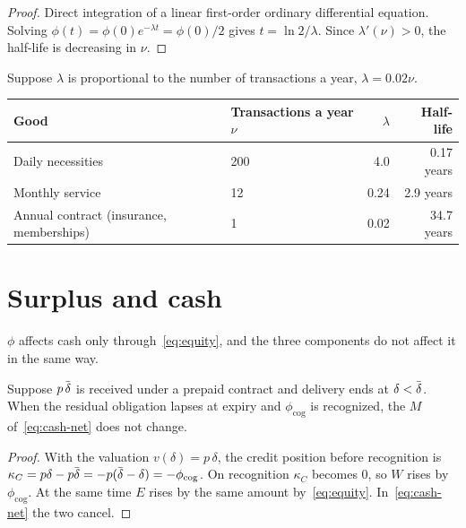 \begin{proof}
Direct integration of a linear first-order ordinary differential equation. Solving
$\phi(t)=\phi(0)e^{-\lambda t}=\phi(0)/2$ gives $t=\ln 2/\lambda$. Since
$\lambda'(\nu)>0$, the half-life is decreasing in $\nu$.
\end{proof}

\begin{example}
Suppose $\lambda$ is proportional to the number of transactions a year, $\lambda = 0.02\nu$.
\begin{center}
\begin{tabular}{@{}llrr@{}}
\toprule
Good & Transactions a year $\nu$ & $\lambda$ & Half-life \\
\midrule
Daily necessities & 200 & 4.0 & 0.17 years \\
Monthly service & 12 & 0.24 & 2.9 years \\
Annual contract (insurance, memberships) & 1 & 0.02 & 34.7 years \\
\bottomrule
\end{tabular}
\label{tab:decay-halflife-example}
\end{center}

\section{Surplus and cash}
\label{sec:surplus-cash}

$\phi$ affects cash only through~\eqref{eq:equity}, and the three components do not affect
it in the same way.

\begin{proposition}
\label{prop:cog-cash-neutral}
Suppose $p\,\dbar$ is received under a prepaid contract and delivery ends at
$\delta<\dbar$. When the residual obligation lapses at expiry and $\phi_{\mathrm{cog}}$ is
recognized, the $M$ of~\eqref{eq:cash-net} does not change.
\end{proposition}

\begin{proof}
With the valuation $v(\delta)=p\,\delta$, the credit position before recognition is
$\kappa_C = p\delta - p\dbar = -p(\dbar-\delta) = -\phi_{\mathrm{cog}}$.
On recognition $\kappa_C$ becomes $0$, so $W$ rises by $\phi_{\mathrm{cog}}$.
At the same time $E$ rises by the same amount by~\eqref{eq:equity}.
In~\eqref{eq:cash-net} the two cancel.
\end{proof}


\end{example}
